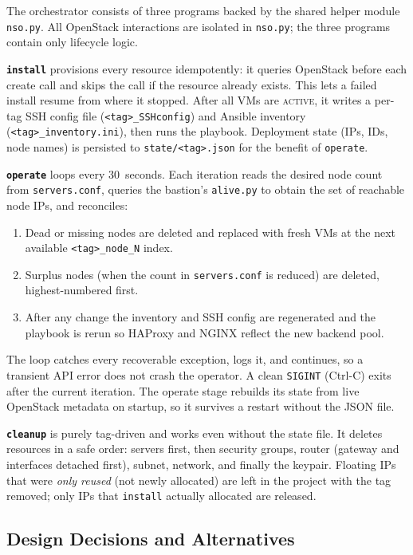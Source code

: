 \documentclass[conference]{IEEEtran}
\begin{document}
The orchestrator consists of three programs backed by the shared
helper module \texttt{nso.py}.  All OpenStack interactions are
isolated in \texttt{nso.py}; the three programs contain only
lifecycle logic.

\textbf{\texttt{install}} provisions every resource idempotently: it
queries OpenStack before each create call and skips the call if the
resource already exists.  This lets a failed install resume from where
it stopped.  After all VMs are \textsc{active}, it writes a per-tag
SSH config file (\texttt{<tag>\_SSHconfig}) and Ansible inventory
(\texttt{<tag>\_inventory.ini}), then runs the playbook.  Deployment
state (IPs, IDs, node names) is persisted to \texttt{state/<tag>.json}
for the benefit of \texttt{operate}.

\textbf{\texttt{operate}} loops every 30~seconds.  Each iteration
reads the desired node count from \texttt{servers.conf}, queries the
bastion's \texttt{alive.py} to obtain the set of reachable node IPs,
and reconciles:
\begin{enumerate}
  \item Dead or missing nodes are deleted and replaced with fresh VMs
        at the next available \texttt{<tag>\_node\_N} index.
  \item Surplus nodes (when the count in \texttt{servers.conf} is
        reduced) are deleted, highest-numbered first.
  \item After any change the inventory and SSH config are regenerated
        and the playbook is rerun so HAProxy and NGINX reflect the
        new backend pool.
\end{enumerate}
The loop catches every recoverable exception, logs it, and continues,
so a transient API error does not crash the operator.  A clean
\texttt{SIGINT} (Ctrl-C) exits after the current iteration.  The
operate stage rebuilds its state from live OpenStack metadata on
startup, so it survives a restart without the JSON file.

\textbf{\texttt{cleanup}} is purely tag-driven and works even without
the state file.  It deletes resources in a safe order: servers first,
then security groups, router (gateway and interfaces detached first),
subnet, network, and finally the keypair.  Floating IPs that were
\emph{only reused} (not newly allocated) are left in the project with
the tag removed; only IPs that \texttt{install} actually allocated are
released.

\subsection{Design Decisions and Alternatives}
\end{document}
